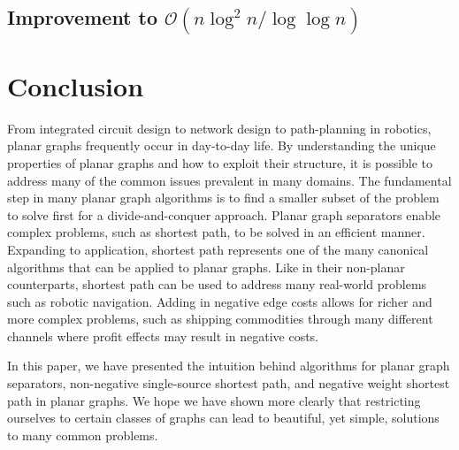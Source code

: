\documentclass[11pt]{article}
\begin{document}
\subsection{Improvement to $\mathcal{O}(n\log^2 n/\log \log n)$}
\label{sec:impr-mathc-nlog}


\section{Conclusion}
\label{sec:conclusion}

From integrated circuit design to network design to path-planning in robotics, planar graphs frequently occur in day-to-day life. By understanding the unique properties of planar graphs and how to exploit their structure, it is possible to address many of the common issues prevalent in many domains. The fundamental step in many planar graph algorithms is to find a smaller subset of the problem to solve first for a divide-and-conquer approach. Planar graph separators enable complex problems, such as shortest path, to be solved in an efficient manner. Expanding to application, shortest path represents one of the many canonical algorithms that can be applied to planar graphs. Like in their non-planar counterparts, shortest path can be used to address many real-world problems such as robotic navigation. Adding in negative edge costs allows for richer and more complex problems, such as shipping commodities through many different channels where profit effects may result in negative costs.

In this paper, we have presented the intuition behind algorithms for planar graph separators, non-negative single-source shortest path, and negative weight shortest path in planar graphs. We hope we have shown more clearly that restricting ourselves to certain classes of graphs can lead to beautiful, yet simple, solutions to many common problems.



\end{document}
